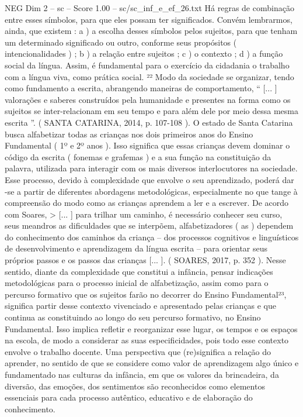 \begin{textsample}{NEG Dim 2 – sc – Score 1.00 – sc/sc\_inf\_e\_ef\_26.txt}
Há regras de combinação entre esses símbolos, para que eles possam ter significados.
Convém lembrarmos, ainda, que existem : a ) a escolha desses símbolos pelos sujeitos, para que tenham um determinado significado ou outro, conforme seus propósitos ( intencionalidades ) ; b ) a relação entre sujeitos ; c ) o contexto ; d ) a função social da língua.
Assim, é fundamental para o exercício da cidadania o trabalho com a língua viva, como prática social. ²² Modo da sociedade se organizar, tendo como fundamento a escrita, abrangendo maneiras de comportamento, “ [... ] valorações e saberes construídos pela humanidade e presentes na forma como os sujeitos se inter-relacionam em seu tempo e para além dele por meio dessa mesma escrita ”. ( SANTA CATARINA, 2014, p. 107-108 ).
O estado de Santa Catarina busca alfabetizar todas as crianças nos dois primeiros anos do Ensino Fundamental ( 1º e 2º anos ).
Isso significa que essas crianças devem dominar o código da escrita ( fonemas e grafemas ) e a sua função na constituição da palavra, utilizada para interagir com os mais diversos interlocutores na sociedade.
Esse processo, devido à complexidade que envolve o seu aprendizado, poderá dar -se a partir de diferentes abordagens metodológicas, especialmente no que tange à compreensão do modo como as crianças aprendem a ler e a escrever.
De acordo com Soares, > [... ] para trilhar um caminho, é necessário conhecer seu curso, seus meandros as dificuldades que se interpõem, alfabetizadores ( as ) dependem do conhecimento dos caminhos da criança – dos processos cognitivos e linguísticos de desenvolvimento e aprendizagem da língua escrita – para orientar seus próprios passos e os passos das crianças [... ]. ( SOARES, 2017, p. 352 ).
Nesse sentido, diante da complexidade que constitui a infância, pensar indicações metodológicas para o processo inicial de alfabetização, assim como para o percurso formativo que os sujeitos farão no decorrer do Ensino Fundamental²³, significa partir desse contexto vivenciado e apresentado pelas crianças e que continua as constituindo ao longo do seu percurso formativo, no Ensino Fundamental.
Isso implica refletir e reorganizar esse lugar, os tempos e os espaços na escola, de modo a considerar as suas especificidades, pois todo esse contexto envolve o trabalho docente.
Uma perspectiva que (re)significa a relação do aprender, no sentido de que se considere como valor de aprendizagem algo único e fundamentado nas culturas da infância, em que os valores da brincadeira, da diversão, das emoções, dos sentimentos são reconhecidos como elementos essenciais para cada processo autêntico, educativo e de elaboração do conhecimento.

\end{textsample}
